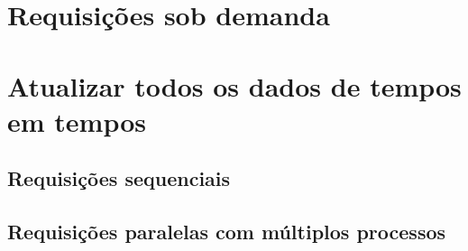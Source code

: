 \label{Cap:implementacao}

\section{Requisições sob demanda}

\section{Atualizar todos os dados de tempos em tempos}

\subsection{Requisições sequenciais}

\subsection{Requisições paralelas com múltiplos processos}

